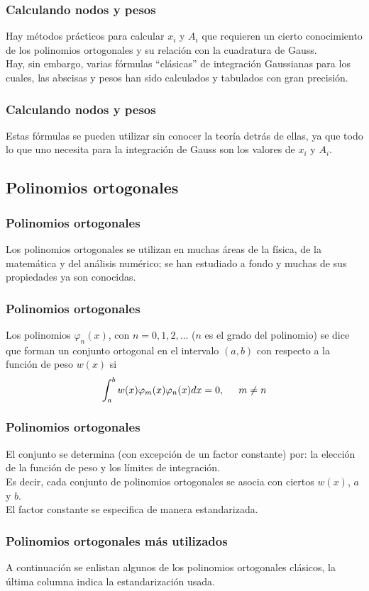 \begin{frame}
\frametitle{Calculando nodos y pesos}
Hay métodos prácticos para calcular $x_{i}$ y $A_{i}$ que requieren un cierto conocimiento de los polinomios ortogonales y su relación con la cuadratura de Gauss.
\\
\bigskip
Hay, sin embargo, varias fórmulas \enquote{clásicas} de integración Gaussianas para los cuales, las abscisas y pesos han sido calculados y tabulados con gran precisión.
\end{frame}
\begin{frame}
\frametitle{Calculando nodos y pesos}
Estas fórmulas se pueden utilizar sin conocer la teoría detrás de ellas, ya que todo lo que uno necesita para la integración de Gauss son los valores de $x_{i}$ y $A_{i}$.
\end{frame}
\subsection{Polinomios ortogonales}
\begin{frame}
\frametitle{Polinomios ortogonales}
Los polinomios ortogonales se utilizan en muchas áreas de la física, de la matemática y del análisis numérico; se han estudiado a fondo y muchas de sus propiedades ya son conocidas. 
\end{frame}
\begin{frame}
\frametitle{Polinomios ortogonales}
Los polinomios $\varphi_{n}(x)$, con $n = 0, 1, 2,\ldots$ ($n$ es el grado del polinomio) se dice que forman un conjunto ortogonal en el intervalo $(a, b)$ con respecto a la función de peso $w(x)$ si
\[ \int_{a}^{b} w(x) \varphi_{m}(x) \varphi_{n}(x) dx = 0, \hspace{0.5cm} m \neq n \]
\end{frame}
\begin{frame}
\frametitle{Polinomios ortogonales}
El conjunto se determina (con excepción de un factor constante) por: la elección de la función de peso y los límites de integración.
\\
\bigskip
Es decir, cada conjunto de polinomios ortogonales se asocia con ciertos $w(x)$, $a$ y $b$.
\\
\bigskip
El factor constante se especifica de manera estandarizada.
\end{frame}
\begin{frame}
\frametitle{Polinomios ortogonales más utilizados}
A continuación se enlistan algunos de los polinomios ortogonales clásicos, la última columna indica la estandarización usada.
\end{frame}
